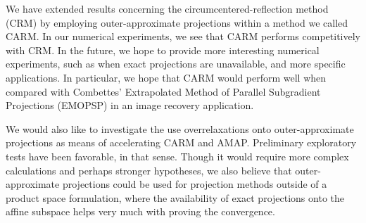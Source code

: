 \documentclass[smallextended,numbook,nospthms]{svjour3}
\theoremstyle{plain}
\theoremstyle{definition}
\begin{document}
We have extended results concerning the circumcentered-reflection method (CRM) by employing outer-approximate projections within a method we called CARM. In our numerical experiments, we see that CARM performs competitively with CRM. In the future, we hope to provide more interesting numerical experiments, such as when exact projections are unavailable, and more specific applications. In particular, we hope that CARM would perform well when compared with Combettes' Extrapolated Method of Parallel Subgradient Projections (EMOPSP) \cite{Combettes:1996} in an image recovery application.

We would also like to investigate the use overrelaxations onto outer-approximate projections as means of accelerating CARM and AMAP. Preliminary exploratory tests have been favorable, in that sense. Though it would require more complex calculations and perhaps stronger hypotheses, we also believe that outer-approximate projections could be used for projection methods outside of a product space formulation, where the availability of exact projections onto the affine subspace helps very much with proving the convergence.

\newpage




\end{document}
